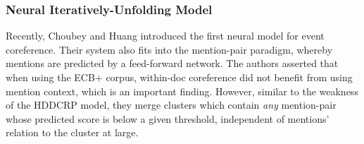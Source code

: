\subsubsection{Neural Iteratively-Unfolding Model}
\label{sec:Choubey}
Recently, Choubey and Huang \cite{Choubey2017EventCR} introduced the first neural model for event coreference.  Their system also fits into the mention-pair paradigm, whereby mentions are predicted by a feed-forward network.  The authors asserted that when using the ECB+ corpus, within-doc coreference did not benefit from using mention context, which is an important finding.  However, similar to the weakness of the HDDCRP model, they merge clusters which contain \textit{any} mention-pair whose predicted score is below a given threshold, independent of mentions' relation to the cluster at large.
